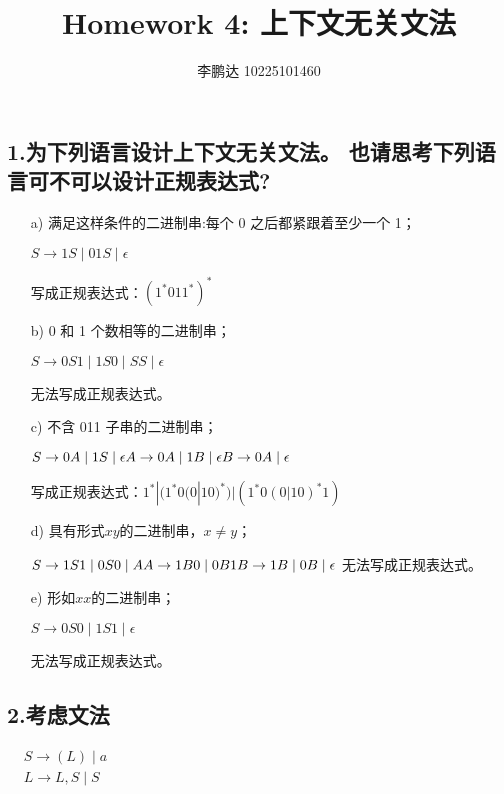 \documentclass[a4paper, body={18cm,22cm}]{article}
\title{Homework 4: 上下文无关文法}
\author{李鹏达 10225101460}
\date{}
\begin{document}
\maketitle

\subsection*{1.为下列语言设计上下文无关文法。 也请思考下列语言可不可以设计正规表达式? }

\begin{enumerate}
    \item[a)] 满足这样条件的二进制串:每个 0 之后都紧跟着至少一个 1；  
    
    $S \to 1S \mid 01S \mid \epsilon
    $

    写成正规表达式：$(1^*011^*)^*$
    \item[b)] 0 和 1 个数相等的二进制串；
    
    $S \to 0S1 \mid 1S0 \mid SS \mid \epsilon$

    无法写成正规表达式。
    \item[c)] 不含 011 子串的二进制串；  
    
    $
    S \to 0A \mid 1S \mid \epsilon \\
    A \to 0A \mid 1B \mid \epsilon \\
    B \to 0A \mid \epsilon
    $

    写成正规表达式：$1^*|(1^*0(0|10)^*)|(1^*0(0|10)^*1)$
    \item[d)] 具有形式$xy$的二进制串，$x \ne y$； 
    
    $S \to 1S1 \mid 0S0 \mid A \\
    A \to 1B0 \mid 0B1 \\
    B \to 1B \mid 0B \mid \epsilon
    $
    无法写成正规表达式。
    \item[e)] 形如$xx$的二进制串；
    
    $S \to 0S0 \mid 1S1 \mid \epsilon$

    无法写成正规表达式。
\end{enumerate}

\subsection*{2.考虑文法}

$
\begin{aligned}
    &S \to (L)\mid a \\
    &L \to L,S\mid S
\end{aligned}
$
\end{document}
